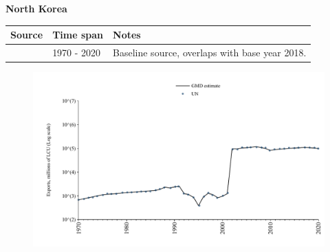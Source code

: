 \documentclass[12pt,a4paper,landscape]{article}
\begin{document}
\begin{adjustbox}{max totalsize={\paperwidth}{\paperheight},center}
\begin{minipage}[t][\textheight][t]{\textwidth}
\vspace*{0.5cm}
{}
\begin{center}
{\Large\bfseries North Korea}
\end{center}
\vspace{0.5cm}
\begin{table}[H]
\centering
\small
\begin{tabular}{|l|l|l|}
\hline
\textbf{Source} & \textbf{Time span} & \textbf{Notes} \\
\hline
\rowcolor{white}\cite{UN}& 1970 - 2020 &Baseline source, overlaps with base year 2018.\\
\hline
\end{tabular}
\end{table}
\begin{figure}[H]
\centering
\includegraphics[width=\textwidth,height=0.6\textheight,keepaspectratio]{graphs/PRK_exports.pdf}
\end{figure}
\end{minipage}
\end{adjustbox}
\end{document}
